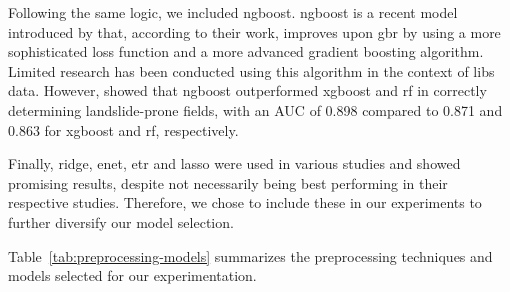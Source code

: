 Following the same logic, we included \gls{ngboost}. 
\gls{ngboost} is a recent model introduced by \citet{duan_ngboost_2020} that, according to their work, improves upon \gls{gbr} by using a more sophisticated loss function and a more advanced gradient boosting algorithm.
Limited research has been conducted using this algorithm in the context of \gls{libs} data. 
However, \citet{ngboost_landslide} showed that \gls{ngboost} outperformed \gls{xgboost} and \gls{rf} in correctly determining landslide-prone fields, with an AUC of 0.898 compared to 0.871 and 0.863 for \gls{xgboost} and \gls{rf}, respectively.

Finally, \gls{ridge}, \gls{enet}, \gls{etr} and \gls{lasso} were used in various studies and showed promising results, despite not necessarily being best performing in their respective studies.
Therefore, we chose to include these in our experiments to further diversify our model selection. 

Table~\ref{tab:preprocessing-models} summarizes the preprocessing techniques and models selected for our experimentation.

